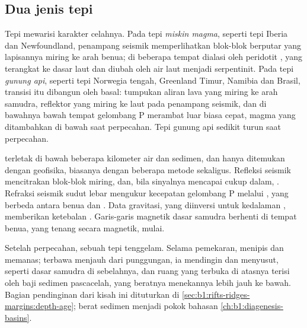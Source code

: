 \subsection*{Dua jenis tepi}

Tepi mewarisi karakter celahnya. Pada tepi \emph{miskin magma}, seperti tepi Iberia dan Newfoundland, penampang seismik memperlihatkan blok-blok berputar yang lapisannya miring ke arah benua; di beberapa tempat  dialasi oleh peridotit , yang terangkat ke dasar laut dan diubah oleh air laut menjadi serpentinit. Pada tepi \emph{gunung api}, seperti tepi Norwegia tengah, Greenland Timur, Namibia dan Brasil, transisi itu dibangun oleh basal: tumpukan aliran lava yang miring ke arah samudra, reflektor yang miring ke laut pada penampang seismik, dan di bawahnya  bawah tempat gelombang P merambat luar biasa cepat, magma yang ditambahkan di bawah  saat perpecahan. Tepi gunung api sedikit turun saat perpecahan.

\begin{inthefield}
 terletak di bawah beberapa kilometer air dan sedimen, dan hanya ditemukan dengan geofisika, biasanya dengan beberapa metode sekaligus. Refleksi seismik mencitrakan blok-blok miring,  dan, bila sinyalnya mencapai cukup dalam, . Refraksi seismik sudut lebar mengukur kecepatan gelombang P melalui , yang berbeda antara  benua dan . Data gravitasi, yang diinversi untuk kedalaman , memberikan ketebalan . Garis-garis magnetik dasar samudra berhenti di tempat  benua, yang tenang secara magnetik, mulai.
\end{inthefield}

Setelah perpecahan, sebuah tepi tenggelam. Selama pemekaran,  menipis dan memanas; terbawa menjauh dari punggungan, ia mendingin dan menyusut, seperti dasar samudra di sebelahnya, dan ruang yang terbuka di atasnya terisi oleh baji sedimen pascacelah, yang beratnya menekannya lebih jauh ke bawah. Bagian pendinginan dari kisah ini dituturkan di \cref{sec:b1:rifts-ridges-margins:depth-age}; berat sedimen menjadi pokok bahasan \cref{ch:b1:diagenesis-basins}.

